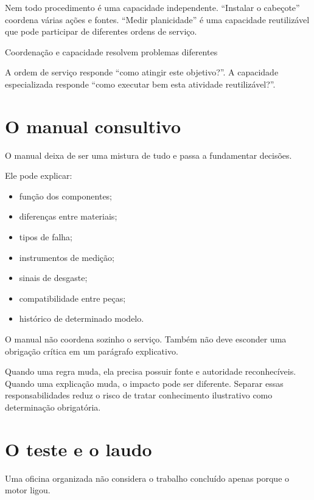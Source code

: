 \documentclass[
  10pt,
  a4paper,
  oneside]{book}
\providecommand{\tightlist}{%
  \setlength{\itemsep}{0pt}\setlength{\parskip}{0pt}}
\begin{document}
Nem todo procedimento é uma capacidade independente. ``Instalar o
cabeçote'' coordena várias ações e fontes. ``Medir planicidade'' é uma
capacidade reutilizável que pode participar de diferentes ordens de
serviço.

\begin{tipbox}{Coordenação e capacidade resolvem problemas diferentes}

A ordem de serviço responde ``como atingir este objetivo?''. A
capacidade especializada responde ``como executar bem esta atividade
reutilizável?''.

\end{tipbox}

\hypertarget{o-manual-consultivo}{%
\section{O manual consultivo}\label{o-manual-consultivo}}

O manual deixa de ser uma mistura de tudo e passa a fundamentar
decisões.

Ele pode explicar:

\begin{itemize}
\tightlist
\item
  função dos componentes;
\item
  diferenças entre materiais;
\item
  tipos de falha;
\item
  instrumentos de medição;
\item
  sinais de desgaste;
\item
  compatibilidade entre peças;
\item
  histórico de determinado modelo.
\end{itemize}

O manual não coordena sozinho o serviço. Também não deve esconder uma
obrigação crítica em um parágrafo explicativo.

Quando uma regra muda, ela precisa possuir fonte e autoridade
reconhecíveis. Quando uma explicação muda, o impacto pode ser diferente.
Separar essas responsabilidades reduz o risco de tratar conhecimento
ilustrativo como determinação obrigatória.

\hypertarget{o-teste-e-o-laudo}{%
\section{O teste e o laudo}\label{o-teste-e-o-laudo}}

Uma oficina organizada não considera o trabalho concluído apenas porque
o motor ligou.
\end{document}
